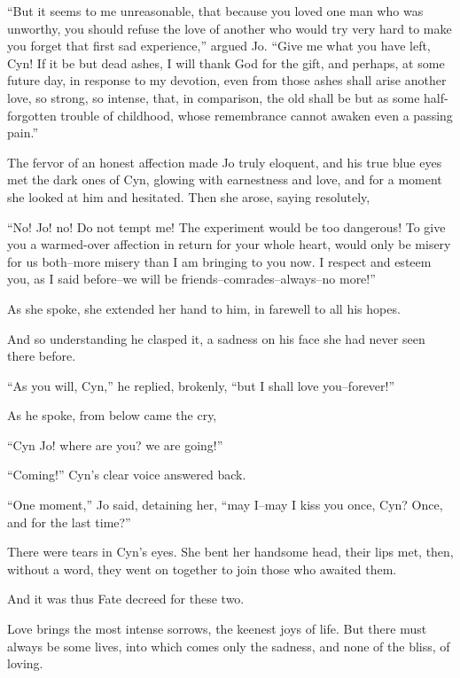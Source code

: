 ``But it seems to me unreasonable, that because you loved one man who was
unworthy, you should refuse the love of another who would try very hard
to make you forget that first sad experience,'' argued Jo. ``Give me what
you have left, Cyn! If it be but dead ashes, I will thank God for the
gift, and perhaps, at some future day, in response to my devotion, even
from those ashes shall arise another love, so strong, so intense, that,
in comparison, the old shall be but as some half-forgotten trouble of
childhood, whose remembrance cannot awaken even a passing pain.''

The fervor of an honest affection made Jo truly eloquent, and his true
blue eyes met the dark ones of Cyn, glowing with earnestness and love,
and for a moment she looked at him and hesitated. Then she arose, saying
resolutely,

``No! Jo! no! Do not tempt me! The experiment would be too dangerous! To
give you a warmed-over affection in return for your whole heart, would
only be misery for us both--more misery than I am bringing to you now. I
respect and esteem you, as I said before--we will be
friends--comrades--always--no more!''

As she spoke, she extended her hand to him, in farewell to all his
hopes.

And so understanding he clasped it, a sadness on his face she had never
seen there before.

``As you will, Cyn,'' he replied, brokenly, ``but I shall love
you--forever!''

As he spoke, from below came the cry,

``Cyn Jo! where are you? we are going!''

``Coming!'' Cyn's clear voice answered back.

``One moment,'' Jo said, detaining her, ``may I--may I kiss you once, Cyn?
Once, and for the last time?''

There were tears in Cyn's eyes. She bent her handsome head, their lips
met, then, without a word, they went on together to join those who
awaited them.

And it was thus Fate decreed for these two.

Love brings the most intense sorrows, the keenest joys of life. But
there must always be some lives, into which comes only the sadness, and
none of the bliss, of loving.








